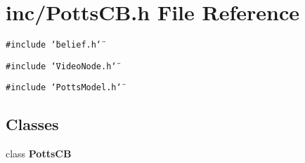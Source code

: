 \section{inc/PottsCB.h File Reference}
\label{PottsCB_8h}
{\tt \#include \char`\"{}belief.h\char`\"{}}\par
{\tt \#include \char`\"{}VideoNode.h\char`\"{}}\par
{\tt \#include \char`\"{}PottsModel.h\char`\"{}}\par
\subsection*{Classes}
\begin{CompactItemize}
\item 
class {\bf PottsCB}
\end{CompactItemize}
